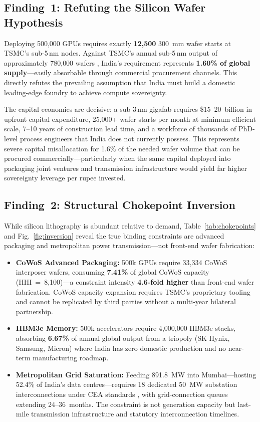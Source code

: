 \documentclass[conference]{IEEEtran}
\begin{document}
\subsection{Finding~1: Refuting the Silicon Wafer Hypothesis}

Deploying 500{,}000 GPUs requires exactly \textbf{12{,}500} 300~mm wafer starts at TSMC's sub-5\,nm nodes. Against TSMC's annual sub-5\,nm output of approximately 780{,}000 wafers \cite{tsmc2025annual}, India's requirement represents \textbf{1.60\% of global supply}---easily absorbable through commercial procurement channels. This directly refutes the prevailing assumption that India must build a domestic leading-edge foundry to achieve compute sovereignty.

The capital economics are decisive: a sub-3\,nm gigafab requires \$15--20~billion in upfront capital expenditure, 25{,}000+ wafer starts per month at minimum efficient scale, 7--10 years of construction lead time, and a workforce of thousands of PhD-level process engineers that India does not currently possess. This represents severe capital misallocation for 1.6\% of the needed wafer volume that can be procured commercially---particularly when the same capital deployed into packaging joint ventures and transmission infrastructure would yield far higher sovereignty leverage per rupee invested.

\subsection{Finding~2: Structural Chokepoint Inversion}

While silicon lithography is abundant relative to demand, Table~\ref{tab:chokepoints} and Fig.~\ref{fig:inversion} reveal the true binding constraints are advanced packaging and metropolitan power transmission---not front-end wafer fabrication:

\begin{itemize}[leftmargin=*, noitemsep, topsep=2pt]
  \item \textbf{CoWoS Advanced Packaging:} 500k GPUs require 33{,}334 CoWoS interposer wafers, consuming \textbf{7.41\%} of global CoWoS capacity (HHI~=~8{,}100)---a constraint intensity \textbf{4.6-fold higher} than front-end wafer fabrication. CoWoS capacity expansion requires TSMC's proprietary tooling and cannot be replicated by third parties without a multi-year bilateral partnership.
  \item \textbf{HBM3e Memory:} 500k accelerators require 4{,}000{,}000 HBM3e stacks, absorbing \textbf{6.67\%} of annual global output from a triopoly (SK Hynix, Samsung, Micron) where India has zero domestic production and no near-term manufacturing roadmap.
  \item \textbf{Metropolitan Grid Saturation:} Feeding 891.8~MW into Mumbai---hosting 52.4\% of India's data centres---requires 18 dedicated 50~MW substation interconnections under CEA standards \cite{cea2026transmission}, with grid-connection queues extending 24--36~months. The constraint is not generation capacity but last-mile transmission infrastructure and statutory interconnection timelines.
\end{itemize}
\end{document}
